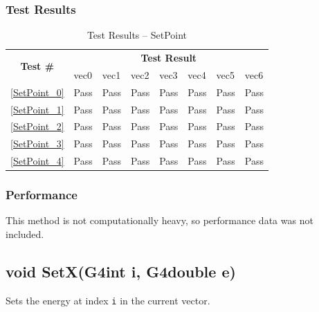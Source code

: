 \documentclass[12pt]{article}
\begin{document}
	\subsubsection{Test Results}
		\begin{table}[H]
		\centering
		\caption{Test Results -- SetPoint}\label{SetPoint_acc}
		
		\begin{tabular}{clllllll}
		\toprule
		\multirow{2}{*}{\bf Test \#} & \multicolumn{7}{c}{\bf Test Result}\\
		& vec0 & vec1 & vec2 & vec3 & vec4 & vec5 & vec6\\\midrule
		\ref{SetPoint_0} & Pass & Pass & Pass & Pass & Pass & Pass & Pass\\
		\ref{SetPoint_1} & Pass & Pass & Pass & Pass & Pass & Pass & Pass\\
		\ref{SetPoint_2} & Pass & Pass & Pass & Pass & Pass & Pass & Pass\\
		\ref{SetPoint_3} & Pass & Pass & Pass & Pass & Pass & Pass & Pass\\
		\ref{SetPoint_4} & Pass & Pass & Pass & Pass & Pass & Pass & Pass\\
		\bottomrule
		\end{tabular}
		\end{table}
	\subsubsection{Performance}
		This method is not computationally heavy, so performance data was not included.

\subsection{void SetX(G4int i, G4double e)}
	
	Sets the energy at index \texttt{i} in the current vector. 
	
\end{document}
